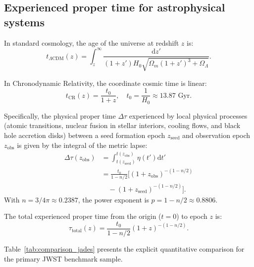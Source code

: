 \documentclass[aps,prd,reprint,superscriptaddress,nofootinbib,floatfix,amsmath,amssymb]{revtex4-2}
\begin{document}
\subsection{Experienced proper time for astrophysical systems}

In standard cosmology, the age of the universe at redshift $z$ is:
\begin{equation}
t_{\Lambda\text{CDM}}(z) = \int_z^\infty \frac{\mathrm{d}z'}{(1+z') H_0 \sqrt{\Omega_m(1+z')^3 + \Omega_\Lambda}}.
\label{eq:lcdm_age}
\end{equation}

In Chronodynamic Relativity, the coordinate cosmic time is linear:
\begin{equation}
t_{\text{CR}}(z) = \frac{t_0}{1+z}, \quad t_0 = \frac{1}{H_0} \approx 13.87\text{ Gyr}.
\label{eq:cr_coord_time}
\end{equation}

Specifically, the physical proper time $\Delta\tau$ experienced by local physical processes (atomic transitions, nuclear fusion in stellar interiors, cooling flows, and black hole accretion disks) between a seed formation epoch $z_{\text{seed}}$ and observation epoch $z_{\text{obs}}$ is given by the integral of the metric lapse:
\begin{align}
\Delta\tau(z_{\text{obs}}) &= \int_{t(z_{\text{seed}})}^{t(z_{\text{obs}})} \eta(t') \mathrm{d}t' \nonumber \\
&= \frac{t_0}{1 - n/2} \big[ (1+z_{\text{obs}})^{-(1 - n/2)} \nonumber \\
&\quad - (1+z_{\text{seed}})^{-(1 - n/2)} \big].
\label{eq:proper_time_integral}
\end{align}
With $n = 3/4\pi \approx 0.2387$, the power exponent is $p = 1 - n/2 \approx 0.8806$.

The total experienced proper time from the origin ($t=0$) to epoch $z$ is:
\begin{equation}
\tau_{\text{total}}(z) = \frac{t_0}{1 - n/2} (1+z)^{-(1 - n/2)}.
\label{eq:total_proper_time}
\end{equation}

Table~\ref{tab:comparison_jades} presents the explicit quantitative comparison for the primary JWST benchmark sample.
\end{document}
